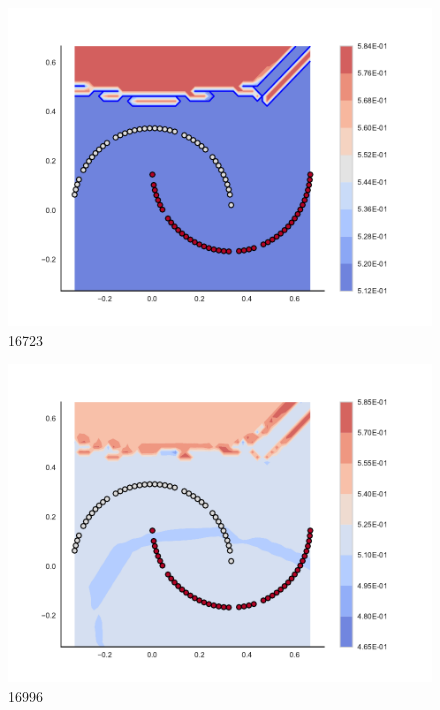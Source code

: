\begin{subfigure}[b]{0.12\textwidth}
    \includegraphics[clip, trim=2.35cm 1.75cm 4.5cm 0cm,width=\textwidth]{img/convergence/16723.pdf}
    \caption{16723}
    \label{fig:convergence_16723}
\end{subfigure}
%
\begin{subfigure}[b]{0.12\textwidth}
    \includegraphics[clip, trim=2.35cm 1.75cm 4.5cm 0cm,width=\textwidth]{img/convergence/16996.pdf}
    \caption{16996}
    \label{fig:convergence_16996}
\end{subfigure}
%
